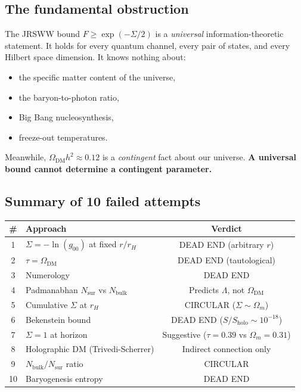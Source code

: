 \documentclass[aps,prd,preprint,superscriptaddress,longbibliography]{revtex4-2}
\newcommand{\tauasym}{\tau}
\begin{document}
\subsection{The fundamental obstruction}

The JRSWW bound $F\ge\exp(-\Sigma/2)$ is a \emph{universal}
information-theoretic statement.  It holds for every quantum channel,
every pair of states, and every Hilbert space dimension.  It knows
nothing about:
\begin{itemize}
\item the specific matter content of the universe,
\item the baryon-to-photon ratio,
\item Big Bang nucleosynthesis,
\item freeze-out temperatures.
\end{itemize}

Meanwhile, $\Omega_{\mathrm{DM}}h^2 \approx 0.12$ is a
\emph{contingent} fact about our universe.
\textbf{A universal bound cannot determine a contingent parameter.}

\subsection{Summary of 10 failed attempts}

\begin{center}
\begin{tabular}{clc}
\toprule
\# & Approach & Verdict \\
\midrule
1 & $\Sigma=-\ln(g_{00})$ at fixed $r/r_H$ & DEAD END (arbitrary $r$) \\
2 & $\tauasym = \Omega_{\mathrm{DM}}$ & DEAD END (tautological) \\
3 & Numerology & DEAD END \\
4 & Padmanabhan $N_{\mathrm{sur}}$ vs $N_{\mathrm{bulk}}$ & Predicts $\Lambda$, not $\Omega_{\mathrm{DM}}$ \\
5 & Cumulative $\Sigma$ at $r_H$ & CIRCULAR ($\Sigma\sim\Omega_m$) \\
6 & Bekenstein bound & DEAD END ($S/S_{\mathrm{holo}}\sim 10^{-18}$) \\
7 & $\Sigma=1$ at horizon & Suggestive ($\tauasym=0.39$ vs $\Omega_m=0.31$) \\
8 & Holographic DM (Trivedi-Scherrer) & Indirect connection only \\
9 & $N_{\mathrm{bulk}}/N_{\mathrm{sur}}$ ratio & CIRCULAR \\
10 & Baryogenesis entropy & DEAD END \\
\bottomrule
\end{tabular}
\end{center}
\end{document}
